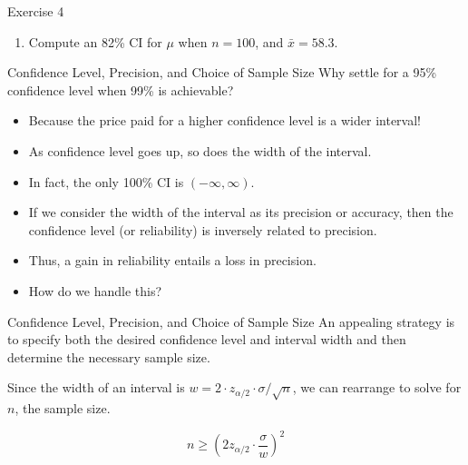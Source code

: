 \documentclass[
  ignorenonframetext,
]{beamer}
\providecommand{\tightlist}{%
  \setlength{\itemsep}{0pt}\setlength{\parskip}{0pt}}\usepackage{longtable,booktabs,array}
\begin{document}
\begin{frame}{Exercise 4}
\protect\hypertarget{exercise-4-3}{}
\begin{enumerate}[<+->]
[a.]
\setcounter{enumi}{3}
\tightlist
\item
  Compute an 82\% CI for \(\mu\) when \(n=100\), and \(\bar{x} = 58.3\).
\end{enumerate}
\end{frame}

\begin{frame}{Confidence Level, Precision, and Choice of Sample Size}
\protect\hypertarget{confidence-level-precision-and-choice-of-sample-size}{}
Why settle for a 95\% confidence level when 99\% is achievable?

\begin{itemize}[<+->]
\tightlist
\item
  Because the price paid for a higher confidence level is a wider
  interval!
\item
  As confidence level goes up, so does the width of the interval.
\item
  In fact, the only 100\% CI is \((-\infty,\infty)\).
\item
  If we consider the width of the interval as its precision or accuracy,
  then the confidence level (or reliability) is inversely related to
  precision.
\item
  Thus, a gain in reliability entails a loss in precision.
\item
  How do we handle this?
\end{itemize}
\end{frame}

\begin{frame}{Confidence Level, Precision, and Choice of Sample Size}
\protect\hypertarget{confidence-level-precision-and-choice-of-sample-size-1}{}
An appealing strategy is to specify both the desired confidence level
and interval width and then determine the necessary sample size.

Since the width of an interval is
\(w = 2\cdot z_{\alpha/2}\cdot \sigma/\sqrt{n}\), we can rearrange to
solve for \(n\), the sample size.

\begin{tcolorbox}[enhanced jigsaw, titlerule=0mm, colbacktitle=quarto-callout-important-color!10!white, opacityback=0, bottomrule=.15mm, colback=white, colframe=quarto-callout-important-color-frame, arc=.35mm, title=\textcolor{quarto-callout-important-color}{\faExclamation}\hspace{0.5em}{Formula}, toprule=.15mm, breakable, coltitle=black, leftrule=.75mm, bottomtitle=1mm, left=2mm, rightrule=.15mm, toptitle=1mm, opacitybacktitle=0.6]

\[
n \geq \left(2z_{\alpha/2}\cdot \frac{\sigma}{w} \right)^{2} 
\]

\end{tcolorbox}
\end{frame}
\end{document}
